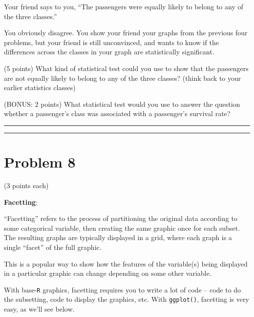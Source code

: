 \documentclass[]{article}
\begin{document}
Your friend says to you, ``The passengers were equally likely to belong
to any of the three classes.''

You obviously disagree. You show your friend your graphs from the
previous four problems, but your friend is still unconvinced, and wants
to know if the differences across the classes in your graph are
statistically significant.

(5 points) What kind of statistical test could you use to show that the
passengers are not equally likely to belong to any of the three classes?
(think back to your earlier statistics classes)

(BONUS: 2 points) What statistical test would you use to answer the
question whether a passenger's class was associated with a passenger's
survival rate?

\begin{center}\rule{0.5\linewidth}{\linethickness}\end{center}

\begin{center}\rule{0.5\linewidth}{\linethickness}\end{center}

\hypertarget{problem-8}{%
\section{Problem 8}\label{problem-8}}

(3 points each)

\textbf{Facetting}:

``Facetting'' refers to the process of partitioning the original data
according to some categorical variable, then creating the same graphic
once for each subset. The resulting graphs are typically displayed in a
grid, where each graph is a single ``facet'' of the full graphic.

This is a popular way to show how the features of the variable(s) being
displayed in a particular graphic can change depending on some other
variable.

With base-\texttt{R} graphics, facetting requires you to write a lot of
code -- code to do the subsetting, code to display the graphics, etc.
With \texttt{ggplot()}, facetting is very easy, as we'll see below.
\end{document}
